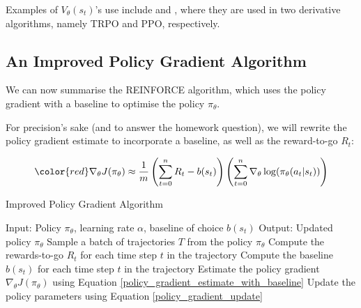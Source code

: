 \documentclass{article} %
\begin{document}
Examples of $V_\theta(s_t)$'s use include \cite{Schulman-et-al-2015} and \cite{Schulman-et-al-2017}, where they are used in two derivative algorithms, namely TRPO and PPO, respectively.

\subsection{An Improved Policy Gradient Algorithm}
We can now summarise the REINFORCE algorithm, which uses the policy gradient with a baseline to optimise the policy $\pi_\theta$.

For precision's sake (and to answer the homework question), we will rewrite the policy gradient estimate to incorporate a baseline, as well as the reward-to-go $R_t$:

\begin{equation} \label{policy_gradient_estimate_with_baseline}
    {\color{red} \nabla_\theta J(\pi_\theta) \approx \frac{1}{m} \left(\sum_{t = 0}^{n} R_t - b(s_t)\right) \left( \sum_{t=0}^{n} \nabla_\theta \log(\pi_\theta(a_t | s_t)) \right)}
\end{equation}

\begin{algorithm}[H]
    \caption{Improved Policy Gradient Algorithm}
    \label{alg:reinforce}
    \begin{algorithmic}[1]
        \State Input: Policy $\pi_\theta$, learning rate $\alpha$, baseline of choice $b(s_t)$
        \State Output: Updated policy $\pi_\theta$
            \State Sample a batch of trajectories $T$ from the policy $\pi_\theta$
                \State Compute the rewards-to-go $R_t$ for each time step $t$ in the trajectory
                \State Compute the baseline $b(s_t)$ for each time step $t$ in the trajectory
                \State Estimate the policy gradient $\nabla_\theta J(\pi_\theta)$ using Equation \eqref{policy_gradient_estimate_with_baseline}
            \EndFor
            \State Update the policy parameters using Equation \eqref{policy_gradient_update}
        \EndWhile
    \end{algorithmic}
\end{algorithm}
\end{document}
